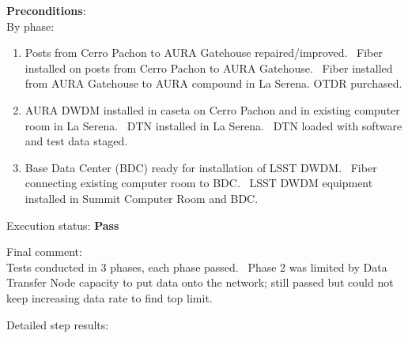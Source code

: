 \documentclass[DM,STR,toc]{lsstdoc}
\providecommand{\tightlist}{
  \setlength{\itemsep}{0pt}\setlength{\parskip}{0pt}}
\begin{document}
    \textbf{ Preconditions}:\\
    By phase:

\begin{enumerate}
\tightlist
\item
  Posts from Cerro Pachon to AURA Gatehouse repaired/improved. ~Fiber
  installed on posts from Cerro Pachon to AURA Gatehouse. ~Fiber
  installed from AURA Gatehouse to AURA compound in La Serena. OTDR
  purchased.
\item
  AURA DWDM installed in caseta on Cerro Pachon and in existing computer
  room in La Serena. ~DTN installed in La Serena. ~DTN loaded with
  software and test data staged.
\item
  Base Data Center (BDC) ready for installation of LSST DWDM. ~Fiber
  connecting existing computer room to BDC. ~LSST DWDM equipment
  installed in Summit Computer Room and BDC.
\end{enumerate}


    Execution status: {\bf Pass }

    Final comment:\\Tests conducted in 3 phases, each phase passed. ~Phase 2 was limited by
Data Transfer Node capacity to put data onto the network; still passed
but could not keep increasing data rate to find top limit.



    Detailed step results:
\end{document}
